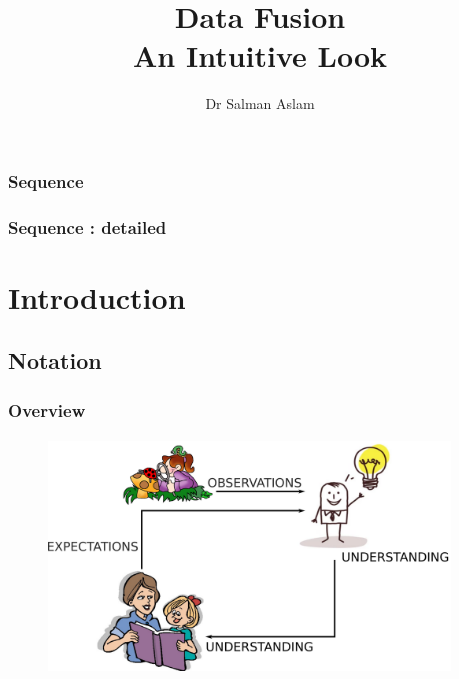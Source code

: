 

\title{Data Fusion\\
An Intuitive Look}  
\author{Dr Salman Aslam}
\date{} 




\begin{frame}[plain]\pw\Large
\vspace{0.8in}
\titlepage
\end{frame}

\begin{frame}[plain]\pw\Large
\frametitle{\textbf{Sequence}}
\setcounter{tocdepth}{1}
\tableofcontents
\end{frame} 

\begin{frame}[plain]\pw\Large
\frametitle{\textbf{Sequence : detailed}}
\setcounter{tocdepth}{2}
\tableofcontents%
\end{frame} 

\section{Introduction}

\subsection{Notation}
\begin{frame}\pw\Large
\frametitle{Overview}
\framesubtitle{}
\begin{figure}
\includegraphics[width=0.95\textwidth]{figs/WFAR11_UCP_Update_Prediction_1_Notation-1.pdf}
\end{figure}
\end{frame}


